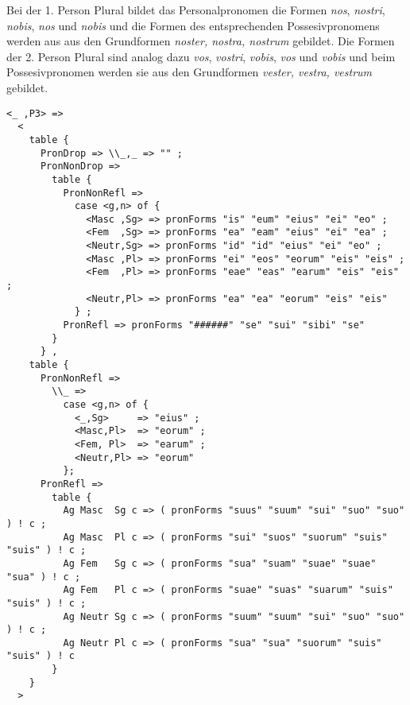Bei der 1. Person Plural bildet das Personalpronomen die Formen \textit{nos}, \textit{nostri}, \textit{nobis}, \textit{nos} und \textit{nobis} und die Formen des entsprechenden Possesivpronomens werden aus aus den Grundformen \textit{noster, nostra, nostrum} gebildet. Die Formen der 2. Person Plural sind analog dazu \textit{vos}, \textit{vostri}, \textit{vobis}, \textit{vos} und \textit{vobis} und beim Possesivpronomen werden sie aus den Grundformen \textit{vester, vestra, vestrum} gebildet. \par
\begin{lstlisting}[float=h!tp,caption={Ausschnitt aus der Funktion \texttt{mkPronoun} für 3. Person Singular und Plural (vgl. \textbf{ResLat.gf})},label={GF-Res-MkPronoun-3},basicstyle=\small]
<_ ,P3> => 
  <
    table {
      PronDrop => \\_,_ => "" ;
      PronNonDrop =>
        table { 
          PronNonRefl => 
            case <g,n> of {
              <Masc ,Sg> => pronForms "is" "eum" "eius" "ei" "eo" ;
              <Fem  ,Sg> => pronForms "ea" "eam" "eius" "ei" "ea" ;
              <Neutr,Sg> => pronForms "id" "id" "eius" "ei" "eo" ;
              <Masc ,Pl> => pronForms "ei" "eos" "eorum" "eis" "eis" ;
              <Fem  ,Pl> => pronForms "eae" "eas" "earum" "eis" "eis" ;
              <Neutr,Pl> => pronForms "ea" "ea" "eorum" "eis" "eis"
            } ;
          PronRefl => pronForms "######" "se" "sui" "sibi" "se"
        }
      } ,
    table {
      PronNonRefl => 
        \\_ =>
          case <g,n> of {
            <_,Sg>     => "eius" ;
            <Masc,Pl>  => "eorum" ;
            <Fem, Pl>  => "earum" ;
            <Neutr,Pl> => "eorum"
          };
      PronRefl =>
        table {
          Ag Masc  Sg c => ( pronForms "suus" "suum" "sui" "suo" "suo" ) ! c ;
          Ag Masc  Pl c => ( pronForms "sui" "suos" "suorum" "suis" "suis" ) ! c ;
          Ag Fem   Sg c => ( pronForms "sua" "suam" "suae" "suae" "sua" ) ! c ;
          Ag Fem   Pl c => ( pronForms "suae" "suas" "suarum" "suis" "suis" ) ! c ;
          Ag Neutr Sg c => ( pronForms "suum" "suum" "sui" "suo" "suo" ) ! c ;
          Ag Neutr Pl c => ( pronForms "sua" "sua" "suorum" "suis" "suis" ) ! c
        }
    }
  > 
\end{lstlisting}
